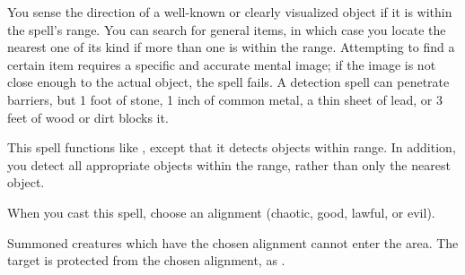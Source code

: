 \begin{spellfooter}
\begin{spellheader}
    \spellrng{\rnglong}
\end{spellheader}
\begin{spellcontent}
    \spelleffect You sense the direction of a well-known or clearly visualized object if it is within the spell's range. You can search for general items, in which case you locate the nearest one of its kind if more than one is within the range. Attempting to find a certain item requires a specific and accurate mental image; if the image is not close enough to the actual object, the spell fails.
    \spellnotes A detection spell can penetrate barriers, but 1 foot of stone, 1 inch of common metal, a thin sheet of lead, or 3 feet of wood or dirt blocks it.
    \spelldur \durmed \dismissable
\end{spellcontent}
\begin{spellfooter}
\end{spellfooter}

\begin{spellheader}
    \spellrng{\rngext}
\end{spellheader}
\begin{spellcontent}
    \spelleffect This spell functions like , except that it detects objects within \rngext range. In addition, you detect all appropriate objects within the range, rather than only the nearest object.
    \spelldur \durmed \dismissable
\end{spellcontent}
\begin{spellfooter}
\end{spellfooter}


\begin{spellheader}
    \spellspecial When you cast this spell, choose an alignment (chaotic, good, lawful, or evil).
\end{spellheader}
\begin{spellcontent}
    \begin{spelltargetinginfo}
    \end{spelltargetinginfo}
    \begin{spelleffects}
        \spelleffect Summoned creatures which have the chosen alignment cannot enter the area.
        \spelleffect The target is protected from the chosen alignment, as .
        \spelldur \durshort \dismissable
    \end{spelleffects}
\end{spellcontent}
\begin{spellfooter}
\end{spellfooter}


\end{spellfooter}
